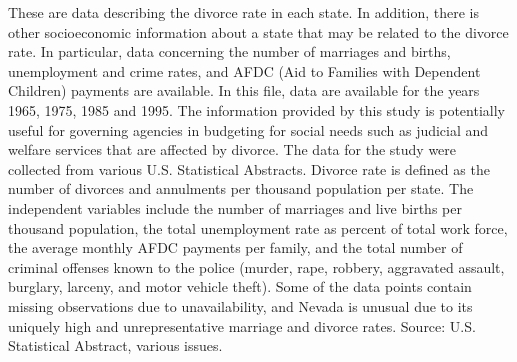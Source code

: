 \documentclass[]{book}
\begin{document}
These are data describing the divorce rate in each state. In addition, there is other socioeconomic information about a state that may be related to the divorce rate. In particular, data concerning the number of marriages and births, unemployment and crime rates, and AFDC (Aid to Families with Dependent Children) payments are available. In this file, data are available for the years 1965, 1975, 1985 and 1995. The information provided by this study is potentially useful for governing agencies in budgeting for social needs such as judicial and welfare services that are affected by divorce. The data for the study were collected from various U.S. Statistical Abstracts. Divorce rate is defined as the number of divorces and annulments per thousand population per state. The independent variables include the number of marriages and live births per thousand population, the total unemployment rate as percent of total work force, the average monthly AFDC payments per family, and the total number of criminal offenses known to the police (murder, rape, robbery, aggravated assault, burglary, larceny, and motor vehicle theft). Some of the data points contain missing observations due to unavailability, and Nevada is unusual due to its uniquely high and unrepresentative marriage and divorce rates. Source: U.S. Statistical Abstract, various issues.
\end{document}
